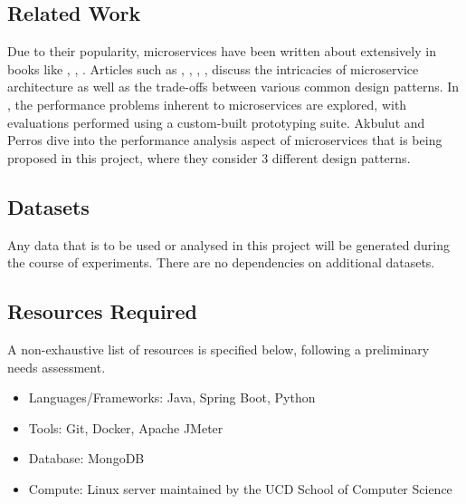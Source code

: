 \subsection{Related Work}
Due to their popularity, microservices have been written about extensively in books like \cite{richardson18}, \cite{kleppmann17}, \cite{newman14}. Articles such as \cite{md19}, \cite{md20}, \cite{sahiti20}, \cite{udantha19}, \cite{lewis14} discuss the intricacies of microservice architecture as well as the trade-offs between various common design patterns. In \cite{cully20}, the performance problems inherent to microservices are explored, with evaluations performed using a custom-built prototyping suite. Akbulut and Perros \cite{akbulut19} dive into the performance analysis aspect of microservices that is being proposed in this project, where they consider 3 different design patterns.

\subsection{Datasets}
Any data that is to be used or analysed in this project will be generated during the course of experiments. There are no dependencies on additional datasets.

\subsection{Resources Required}
A non-exhaustive list of resources is specified below, following a preliminary needs assessment.

\begin{itemize}
  \item Languages/Frameworks: Java, Spring Boot, Python
  \item Tools: Git, Docker, Apache JMeter
  \item Database: MongoDB
  \item Compute: Linux server maintained by the UCD School of Computer Science
\end{itemize}

